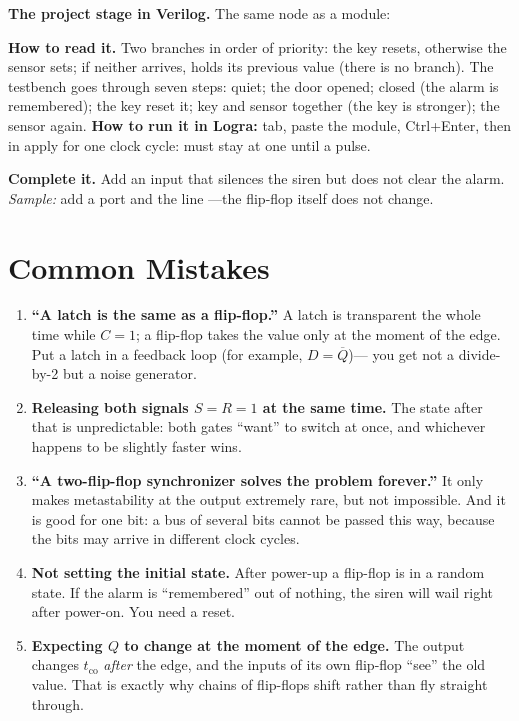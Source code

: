 \textbf{The project stage in Verilog.} The same node as a module:


\textbf{How to read it.} Two branches in order of priority: the key resets,
otherwise the sensor sets; if neither arrives,  holds its previous
value (there is no  branch). The testbench 
goes through seven steps: quiet; the door opened; closed (the alarm is
remembered); the key reset it; key and sensor together (the key is stronger);
the sensor again. \textbf{How to run it in Logra:}  tab, paste the
module, Ctrl+Enter, then in  apply  for one clock
cycle:  must stay at one until a  pulse.

\textbf{Complete it.} Add an input  that silences the siren but does
not clear the alarm. \emph{Sample:} add a port  and the line
---the flip-flop itself does
not change.

\section{Common Mistakes}

\begin{warnbox}
\begin{enumerate}
  \item \textbf{``A latch is the same as a flip-flop.''} A latch is transparent
        the whole time while $C=1$; a flip-flop takes the value only at the
        moment of the edge. Put a latch in a feedback loop (for example, $D=\overline{Q}$)---
        you get not a divide-by-2 but a noise generator.
  \item \textbf{Releasing both signals $S=R=1$ at the same time.} The state after
        that is unpredictable: both gates ``want'' to switch at once, and
        whichever happens to be slightly faster wins.
  \item \textbf{``A two-flip-flop synchronizer solves the problem forever.''} It
        only makes metastability at the output extremely
        rare, but not impossible. And it is good for one bit: a bus of
        several bits cannot be passed this way, because the bits may arrive in
        different clock cycles.
  \item \textbf{Not setting the initial state.} After power-up
        a flip-flop is in a random state. If the alarm is ``remembered'' out of
        nothing, the siren will wail right after power-on. You need a reset.
  \item \textbf{Expecting $Q$ to change at the moment of the edge.} The output changes
        $t_\text{co}$ \emph{after} the edge, and the inputs of its own
        flip-flop ``see'' the old value. That is exactly why chains of flip-flops shift
        rather than fly straight through.
\end{enumerate}
\end{warnbox}

